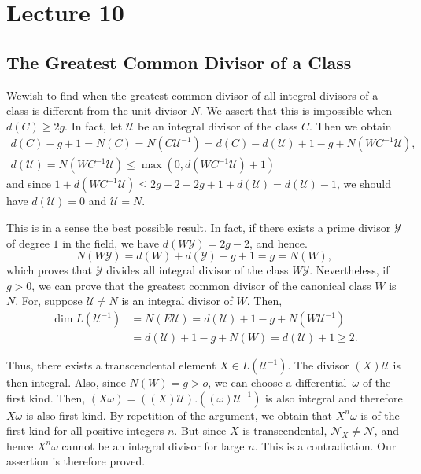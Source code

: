 \chapter{Lecture 10}\label{chap10}%

\setcounter{section}{19}
\section{The Greatest Common Divisor of a Class}\label{chap10:sec20}%

We\pageoriginale wish to find when the greatest common divisor of all integral
divisors of a class is different from the unit divisor $N$. We assert
that this is impossible when $d(C) \ge 2g$. In fact, let $\mathscr{U}$ be an
integral divisor of the class $C$. Then we obtain 
{\fontsize{10pt}{12pt}\selectfont
\begin{gather*}
  d(C) - g + 1 = N(C) = N (C \mathscr{U}^{-1}) = d (C) - d
  (\mathscr{U}) + 1 - g + N(WC^{-1} \mathscr{U}),\\ 
  d(\mathscr{U}) = N(WC^{-1} \mathscr{U}) \le \max (0, d (WC^{-1}
  \mathscr{U}) + 1) 
\end{gather*}}\relax
and since $1 + d (WC^{-1} \mathscr{U}) \le 2g - 2 - 2g + 1 + d
(\mathscr{U}) = d (\mathscr{U}) - 1$, we should have $d(\mathscr{U}) =
0$ and $\mathscr{U} = N$.  

This is in a sense the best possible result. In fact, if there exists
a prime divisor $\mathscr{Y}$ of degree $1$ in the field, we have $d(W
\mathscr{Y}) = 2g - 2$, and hence. 
$$
N(W \mathscr{Y}) = d(W) + d(\mathscr{Y}) - g + 1 = g = N (W),
$$
which proves that $\mathscr{Y}$ divides all integral divisor of the
class $W \mathscr{Y}$. Nevertheless, if $g > 0 $, we can prove that the
greatest common divisor of the canonical class $W$ is $N$. For,
suppose $\mathscr{U} \neq N$ is an integral divisor of $W$. Then, 
\begin{align*}
  \dim L(\mathscr{U}^{-1}) & = N (E \mathscr{U}) = d (\mathscr{U}) + 1 - g +
  N(W \mathscr{U}^{-1})\\ 
  & = d(\mathscr{U}) + 1 - g + N (W) = d (\mathscr{U}) + 1 \ge 2.
\end{align*}

Thus, there exists a transcendental element $X \in L
(\mathscr{U}^{-1})$. The divisor $(X) \mathscr{U}$ is then
integral. Also, since $N(W) = g > o$, we can choose a differential\pageoriginale\
$\omega$ of the first kind. Then, $(X \omega) = ((X)
\mathscr{U}). ((\omega) \mathscr{U}^{-1})$ is also integral and
therefore $X \omega$ is also first kind. By repetition of the
argument, we obtain that $X^n \omega$  is of the first kind for all
positive integers $n$. But since $X$ is transcendental, $
\mathscr{N}_X \neq \mathscr{N}$, and hence $X^n \omega$ cannot be an
integral divisor for large $n$. This is a contradiction. Our assertion
is therefore proved.  


